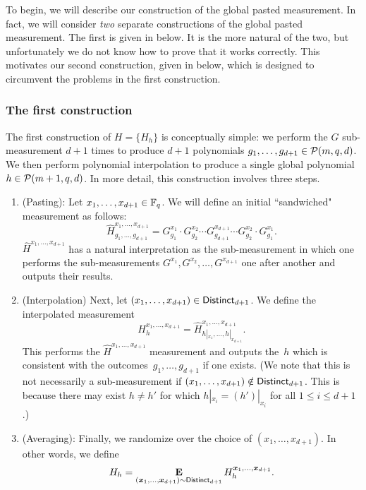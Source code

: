 To begin, we will describe our construction of the global pasted measurement.
In fact, we will consider \emph{two} separate constructions of the global pasted measurement.
The first is given in  below.
It is the more natural of the two,
but unfortunately we do not know how to prove that it works correctly.
This motivates our second construction,
given in  below,
which is designed to circumvent the problems in the first construction.

\subsubsection{The first construction}\label{sec:construction-numba-one}

The first construction of $H = \{H_h\}$ is conceptually simple:
we perform the $G$ sub-measurement $d+1$ times to produce $d+1$ polynomials $g_1, \ldots, g_{d+1} \in \mathcal{P}(m, q, d)$.
We then perform polynomial interpolation to produce a single global polynomial $h \in \mathcal{P}(m+1, q, d)$.
In more detail, this construction involves three steps.

\begin{enumerate}
\item (Pasting):
Let $x_1, \ldots, x_{d+1} \in \mathbb F_q$.
We will define an initial ``sandwiched" measurement as follows:
\begin{equation*}
\widehat{H}^{x_1, \ldots, x_{d+1}}_{g_1, \ldots, g_{d+1}} = G^{x_1}_{g_1} \cdot G^{x_2}_{g_2} \cdots G^{x_{d+1}}_{g_{d+1}} \cdots G^{x_2}_{g_2} \cdot G^{x_1}_{g_1}.
\end{equation*}
$\widehat{H}^{x_1, \ldots, x_{d+1}}$ has a natural interpretation as the sub-measurement in which one performs the sub-measurements $G^{x_1}, G^{x_2}, \ldots, G^{x_{d+1}}$ one after another and outputs their results.
\item (Interpolation)
Next, let $(x_1, \ldots, x_{d+1}) \in \mathsf{Distinct}_{d+1}$.
We define the interpolated measurement
\begin{equation*}
H^{x_1, \ldots, x_{d+1}}_{h}
= \widehat{H}^{x_1, \ldots, x_{d+1}}_{h|_{x_1}, \ldots, h|_{x_{d+1}}}.
\end{equation*}
This performs the $\widehat{H}^{x_1, \ldots, x_{d+1}}$ measurement and outputs the~$h$
which is consistent with the outcomes~$g_1, \ldots, g_{d+1}$ if one exists.
(We note that this is not necessarily a sub-measurement if $(x_1, \ldots, x_{d+1}) \notin \mathsf{Distinct}_{d+1}$. This is because there may exist $h \neq h'$ for which $h|_{x_i} = (h')|_{x_i}$ for all $1 \leq i \leq d+1$.)
\item (Averaging):
Finally, we randomize over the choice of $(x_1, \ldots, x_{d+1})$. In other words, we define
\begin{equation*}
H_{h} = \mathop{\bf E\/}_{({\boldsymbol{x}}_1, \ldots, {\boldsymbol{x}}_{d+1}) \sim \mathsf{Distinct}_{d+1}} H^{{\boldsymbol{x}}_1, \ldots, {\boldsymbol{x}}_{d+1}}_h.
\end{equation*}
\end{enumerate}


